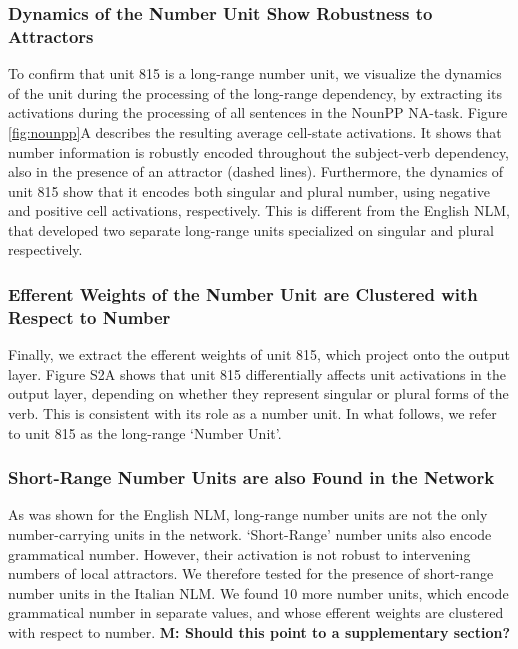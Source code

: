 \subsubsection{Dynamics of the Number Unit Show Robustness to Attractors} 
To confirm that unit 815 is a long-range number unit, we visualize the dynamics of the unit during the processing of the long-range dependency, by extracting its activations during the processing of all sentences in the NounPP NA-task. Figure \ref{fig:nounpp}A describes the resulting average cell-state activations. It shows that number information is robustly encoded throughout the subject-verb dependency, also in the presence of an attractor (dashed lines). Furthermore, the dynamics of unit 815 show that it encodes both singular and plural number, using negative and positive cell activations, respectively. This is different from the English NLM, that developed two separate long-range units specialized on singular and plural respectively.

\subsubsection{Efferent Weights of the Number Unit are Clustered with Respect to Number}
Finally, we extract the efferent weights of unit 815, which project onto the output layer. Figure S2A shows that unit 815 differentially affects unit activations in the output layer, depending on whether they represent singular or plural forms of the verb. This is consistent with its role as a number unit. In what follows, we refer to unit 815 as the long-range `Number Unit'.

\subsubsection{Short-Range Number Units are also Found in the Network}
As was shown for the English NLM, long-range number units are not the only number-carrying units in the network. `Short-Range' number units also encode grammatical number. However, their activation is not robust to intervening numbers of local attractors. We therefore tested for the presence of short-range number units in the Italian NLM. We found 10 more number units, which encode grammatical number in separate values, and whose efferent weights are clustered with respect to number. \textbf{M: Should this point to a supplementary section?}

